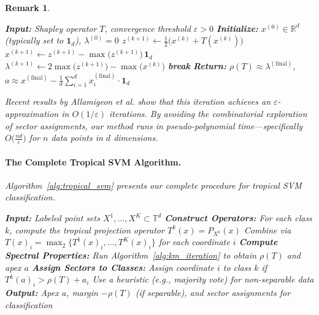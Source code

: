 \documentclass{article}
\newtheorem{remark}{Remark}
\newcommand{\R}{\mathbb{R}}
\newcommand{\trop}{\mathbb{T}}
\begin{document}
\begin{remark}
\begin{algorithm}
\caption{Krasnoselskii--Mann Iteration for Tropical SVM}\label{alg:km_iteration}
\begin{algorithmic}[1]
\STATE \textbf{Input:} Shapley operator $T$, convergence threshold $\varepsilon > 0$
\STATE \textbf{Initialize:} $x^{(0)} \in \R^d$ (typically set to $\mathbf{1}_d$), $\lambda^{(0)} = 0$
  \STATE $z^{(k+1)} \leftarrow \frac{1}{2}\bigl(x^{(k)} + T(x^{(k)})\bigr)$ 
  \STATE $x^{(k+1)} \leftarrow z^{(k+1)} - \max\bigl(z^{(k+1)}\bigr)\,\mathbf{1}_d$ 
  \STATE $\lambda^{(k+1)} \leftarrow 2\max\bigl(z^{(k+1)}\bigr) - \max\bigl(x^{(k)}\bigr)$ 
    \STATE \textbf{break}
  \ENDIF
\ENDFOR
\STATE \textbf{Return:} $\rho(T) \approx \lambda^{(\text{final})}$, $a \approx x^{(\text{final})} - \frac{1}{d}\sum_{i=1}^d x_i^{(\text{final})} \cdot \mathbf{1}_d$
\end{algorithmic}
\end{algorithm}
Recent results by Allamigeon et al. \cite{allamigeon2025} show that this iteration achieves an $\varepsilon$-approximation in $O(1/\varepsilon)$ iterations. By avoiding the combinatorial exploration of sector assignments, our method runs in pseudo-polynomial time—specifically $O\bigl(\frac{nd}{\varepsilon}\bigr)$ for $n$ data points in $d$ dimensions.

\paragraph{The Complete Tropical SVM Algorithm.}\label{subsec:complete_algorithm}
Algorithm~\ref{alg:tropical_svm} presents our complete procedure for tropical SVM classification.

\begin{algorithm}
\caption{Tropical SVM}\label{alg:tropical_svm}
\begin{algorithmic}[1]
\STATE \textbf{Input:} Labeled point sets $X^1,\dots,X^K \subset \trop^d$
\STATE \textbf{Construct Operators:}
  \STATE \quad For each class $k$, compute the tropical projection operator $T^k(x) = P_{X^k}(x)$
  \STATE \quad Combine via $T(x)_i = \operatorname{\max}_2\{T^1(x)_i, \dots, T^K(x)_i\}$ for each coordinate $i$
\STATE \textbf{Compute Spectral Properties:}
  \STATE \quad Run Algorithm~\ref{alg:km_iteration} to obtain $\rho(T)$ and apex $a$
\STATE \textbf{Assign Sectors to Classes:}
    \STATE Assign coordinate $i$ to class $k$ if $T^k(a)_i > \rho(T) + a_i$ 
  \ELSE
    \STATE Use a heuristic (e.g., majority vote) for non-separable data 
  \ENDIF
\STATE \textbf{Output:} Apex $a$, margin $-\rho(T)$ (if separable), and sector assignments for classification
\end{algorithmic}
\end{algorithm}


\end{remark}
\end{document}
